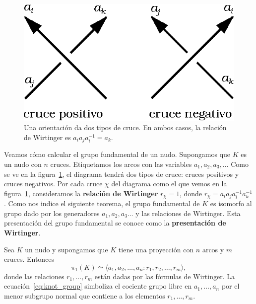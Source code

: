 \documentclass[graybox]{svmult}
\begin{document}
\label{block:Wirtinger}
\begin{figure}
    \centering
	\includegraphics[scale=0.6]{images/crossings}
    \caption{Una orientación da dos tipos de
    cruce. En ambos casos, la relación de Wirtinger es $a_ia_ja_i^{-1}=a_k$.}
    \label{fig:crossings}
\end{figure}

    Veamos cómo calcular el grupo fundamental de un nudo.  Supongamos que $K$
    es un nudo con $n$ cruces.  Etiquetamos los arcos con las variables
    $a_1,a_2,a_3,\dots$ Como se ve en la figura~\ref{fig:crossings}, el
    diagrama tendrá dos tipos de cruce: cruces positivos y cruces negativos.
    Por cada cruce $\chi$ del diagrama como el que vemos en la
    figura~\ref{fig:crossings}, consideramos la \textbf{relación de Wirtinger}
    $r_\chi=1$, donde 
    $r_\chi = a_ia_ja_i^{-1}a_k^{-1}$. Como nos indice el siguiente teorema, 
	el grupo fundamental de
    $K$ es isomorfo al grupo dado por los generadores $a_1,a_2,a_3\dots$ y
    las relaciones de Wirtinger.  Esta presentación del grupo
    fundamental se conoce como la \textbf{presentación de Wirtinger}.

    \begin{theorem}[Wirtinger]
        Sea $K$ un nudo y supongamos que $K$ tiene una proyección con $n$ arcos
        y $m$ cruces. Entonces
        \begin{equation}
            \label{eq:knot_group}
            \pi_1(K)\simeq \langle a_1,a_2,\dots,a_n : r_1,r_2,\dots,r_m\rangle,
        \end{equation}
        donde las relaciones $r_1,\dots,r_m$ están dadas por las
        fórmulas de Wirtinger. La ecuación~\eqref{eq:knot_group}
        simboliza el cociente grupo libre en $a_1,\dots,a_n$ por el menor
        subgrupo normal que contiene a los elementos $r_1,\dots,r_m$. 
    \end{theorem}
\end{document}
